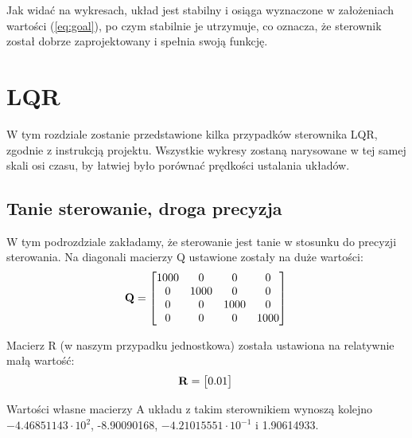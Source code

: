 \documentclass{article}
\begin{document}
Jak widać na wykresach, układ jest stabilny i osiąga wyznaczone w założeniach wartości (\ref{eq:goal}), po czym stabilnie je utrzymuje, co oznacza, że sterownik został dobrze zaprojektowany i spełnia swoją funkcję.

\section{LQR}

W tym rozdziale zostanie przedstawione kilka przypadków sterownika LQR, zgodnie z instrukcją projektu. Wszystkie wykresy zostaną narysowane w tej samej skali osi czasu, by łatwiej było porównać prędkości ustalania układów.

\subsection{Tanie sterowanie, droga precyzja}
W tym podrozdziale zakładamy, że sterowanie jest tanie w stosunku do precyzji sterowania. Na diagonali macierzy Q ustawione zostały na duże wartości:
\begin{equation}\label{eq:q1}
\mathbf{Q} = \begin{bmatrix}  1000 & 0 & 0 & 0 \\
  							  0 & 1000 & 0 & 0 \\
  							  0 & 0 & 1000 & 0 \\
  							  0 & 0 & 0 & 1000 \\ 
  			   \end{bmatrix} \\ \\
\end{equation}

Macierz R (w naszym przypadku jednostkowa) została ustawiona na relatywnie małą wartość:
\begin{equation}\label{eq:r1}
\mathbf{R} = \begin{bmatrix}  0.01
  			   \end{bmatrix} \\ \\
\end{equation}

Wartości własne macierzy A układu z takim sterownikiem wynoszą kolejno $-4.46851143\cdot10^{2}$, -8.90090168, $-4.21015551\cdot10^{-1}$ i 1.90614933.
\end{document}
